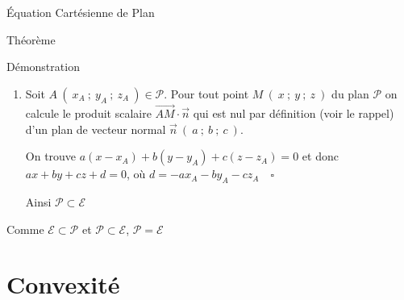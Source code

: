 \documentclass{coursbook}
\begin{document}
\begin{Gpartie}{Équation Cartésienne de Plan}
\begin{Spartie}{Théorème}
\begin{SSpartie}{Démonstration}
\begin{enumerate}[(1)]
                    Quel que soit 
                    $\begin{aligned}[t]
                        M~\left(~x~;~y~;~z~\right)\in\mathcal{E},~\overrightarrow{AM}\cdot\vec{n}=0&\iff\begin{psmallmatrix} x-\frac{-d}{a} \\ y \\ z\end{psmallmatrix}\cdot \begin{psmallmatrix}a \\ b \\ c\end{psmallmatrix} \\ &\iff a x+by+cz+d=0 %
                    \end{aligned}$

                    Donc, tout point $M$ de $\mathcal{E}$ vérifie $\overrightarrow{AM}\cdot\vec{n}=0$, donc appartient au plan passant par $A$ et de vecteur normal $\vec{n}$. (c'est la caractérisation d'un plan) $\quad\square$

                    Ainsi, $\mathcal{E}\subset\mathcal{P}$

                    \item   Soit $A~\left(~x_A~;~y_A~;~z_A~\right)\in\mathcal{P}$. Pour tout point $M~\left(~x~;~y~;~z~\right)$ du plan $\mathcal{P}$ on calcule le produit scalaire $\overrightarrow{AM}\cdot\vec{n}$ qui est nul par définition (voir le rappel) d'un plan de vecteur normal $\vec{n}~\left(~a~;~b~;~c~\right)$.
                    
                    On trouve $a\left(x-x_A\right)+b\left(y-y_A\right)+c\left(z-z_A\right)=0$ et donc $ax+by+cz+d=0$, où $d=-ax_A-by_A-cz_A\quad\square$

                    Ainsi $\mathcal{P}\subset\mathcal{E}$
                \end{enumerate}
                \vspace*{2ex}
                Comme $\mathcal{E}\subset\mathcal{P}$ et $\mathcal{P}\subset\mathcal{E}$, $\mathcal{P}=\mathcal{E}$
            \end{SSpartie}
        \end{Spartie}
    \end{Gpartie}

    \chapter{Convexité}
\end{document}
